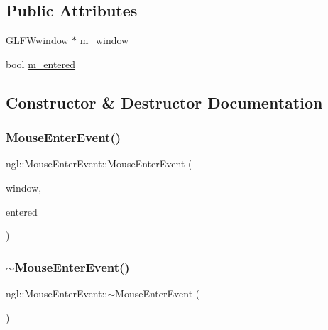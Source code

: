 \subsection*{Public Attributes}
\begin{DoxyCompactItemize}
\item 
G\+L\+F\+Wwindow $\ast$ \mbox{\hyperlink{structngl_1_1_mouse_enter_event_a2f2ea0500ef1f87f1eb70f1b481d741b}{m\+\_\+window}}
\item 
bool \mbox{\hyperlink{structngl_1_1_mouse_enter_event_a714b8059fc11073b4a90faa31a0dfbe4}{m\+\_\+entered}}
\end{DoxyCompactItemize}


\subsection{Constructor \& Destructor Documentation}
\mbox{\label{structngl_1_1_mouse_enter_event_ad05521e030866d3d036662f2938d8b54}} 
\subsubsection{\texorpdfstring{Mouse\+Enter\+Event()}{MouseEnterEvent()}}
{\footnotesize\ttfamily ngl\+::\+Mouse\+Enter\+Event\+::\+Mouse\+Enter\+Event (\begin{DoxyParamCaption}\item[{G\+L\+F\+Wwindow $\ast$}]{window,  }\item[{const bool}]{entered }\end{DoxyParamCaption})}

\mbox{\label{structngl_1_1_mouse_enter_event_a204bbe3eb5bdf812f06f317ba0cdb411}} 
\subsubsection{\texorpdfstring{$\sim$\+Mouse\+Enter\+Event()}{~MouseEnterEvent()}}
{\footnotesize\ttfamily ngl\+::\+Mouse\+Enter\+Event\+::$\sim$\+Mouse\+Enter\+Event (\begin{DoxyParamCaption}{ }\end{DoxyParamCaption})}



